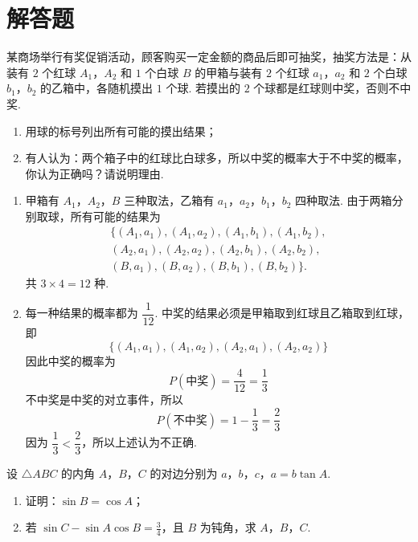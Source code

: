 \section{解答题}

\begin{problem}
某商场举行有奖促销活动，顾客购买一定金额的商品后即可抽奖，抽奖方法是：从装有 \(2\) 个红球 \(A_{1}\)，\(A_{2}\) 和 \(1\) 个白球 \(B\) 的甲箱与装有 \(2\) 个红球 \(a_{1}\)，\(a_{2}\) 和 \(2\) 个白球 \(b_{1}\)，\(b_{2}\) 的乙箱中，各随机摸出 \(1\) 个球. 若摸出的 \(2\) 个球都是红球则中奖，否则不中奖.
\begin{enumerate}
\item 用球的标号列出所有可能的摸出结果；
\item 有人认为：两个箱子中的红球比白球多，所以中奖的概率大于不中奖的概率，你认为正确吗？请说明理由.
\end{enumerate}
\end{problem}

\begin{solution}
\begin{enumerate}
\item 甲箱有 \(A_{1}\)，\(A_{2}\)，\(B\) 三种取法，乙箱有 \(a_{1}\)，\(a_{2}\)，\(b_{1}\)，\(b_{2}\) 四种取法. 由于两箱分别取球，所有可能的结果为
\[
\begin{gathered}
\{(A_{1},a_{1}),(A_{1},a_{2}),(A_{1},b_{1}),(A_{1},b_{2}),\\
(A_{2},a_{1}),(A_{2},a_{2}),(A_{2},b_{1}),(A_{2},b_{2}),\\
(B,a_{1}),(B,a_{2}),(B,b_{1}),(B,b_{2})\}.
\end{gathered}
\]
共 \(3\times4=12\) 种.

\item 每一种结果的概率都为 \(\dfrac{1}{12}\). 中奖的结果必须是甲箱取到红球且乙箱取到红球，即
\[
\{(A_{1},a_{1}),(A_{1},a_{2}),(A_{2},a_{1}),(A_{2},a_{2})\}
\]
因此中奖的概率为
\[
P(\text{中奖})=\frac{4}{12}=\frac{1}{3}
\]
不中奖是中奖的对立事件，所以
\[
P(\text{不中奖})=1-\frac{1}{3}=\frac{2}{3}
\]
因为 \(\dfrac{1}{3}<\dfrac{2}{3}\)，所以上述认为不正确.
\end{enumerate}
\end{solution}

\begin{problem}
设 \(\triangle ABC\) 的内角 \(A\)，\(B\)，\(C\) 的对边分别为 \(a\)，\(b\)，\(c\)，\(a = b \tan A\).
\begin{enumerate}
\item 证明：\(\sin B = \cos A\)；
\item 若 \(\sin C - \sin A\cos B = \frac{3}{4}\)，且 \(B\) 为钝角，求 \(A\)，\(B\)，\(C\).
\end{enumerate}
\end{problem}

